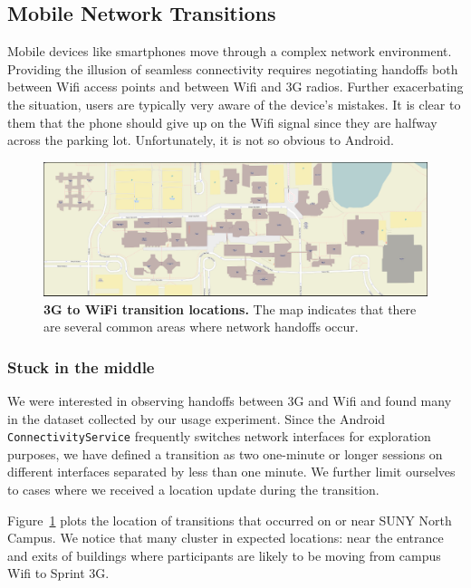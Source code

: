 \subsection{Mobile Network Transitions}
\label{subsec-networktransitions}

Mobile devices like smartphones move through a complex network environment.
Providing the illusion of seamless connectivity requires negotiating handoffs
both between Wifi access points and between Wifi and 3G radios. Further
exacerbating the situation, users are typically very aware of the device's
mistakes. It is clear to them that the phone should give up on the Wifi
signal since they are halfway across the parking lot. Unfortunately, it is
not so obvious to Android.

\begin{figure}[t]
\includegraphics[width=\textwidth]{./figures/networking/transition_locations/graph.pdf}
\caption{\textbf{3G to WiFi transition locations.} The map indicates that
there are several common areas where network handoffs occur.}
\label{figure-networktransitions}
\end{figure}

\subsubsection{Stuck in the middle}

We were interested in observing handoffs between 3G and Wifi and found many
in the dataset collected by our usage experiment. Since the Android
\texttt{ConnectivityService} frequently switches network interfaces for
exploration purposes, we have defined a transition as two one-minute or
longer sessions on different interfaces separated by less than one minute. We
further limit ourselves to cases where we received a location update during
the transition.

Figure~\ref{figure-networktransitions} plots the location of transitions that
occurred on or near SUNY North Campus. We notice that many cluster in
expected locations: near the entrance and exits of buildings where
participants are likely to be moving from campus Wifi to Sprint 3G.


